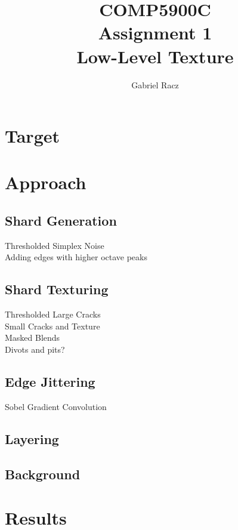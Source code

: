 \documentclass[a4paper, 11pt, titlepage]{article}
\title{COMP5900C\\
Assignment 1\\
Low-Level Texture}
\author{Gabriel Racz}
\begin{document}
\maketitle
\section{Target}
\section{Approach}
\subsection{Shard Generation}
Thresholded Simplex Noise \\
Adding edges with higher octave peaks
\subsection{Shard Texturing}
Thresholded Large Cracks \\
Small Cracks and Texture \\
Masked Blends \\
Divots and pits?
\subsection{Edge Jittering}
Sobel Gradient Convolution
\subsection{Layering}
\subsection{Background}
\section{Results}

\pagebreak
\end{document}
